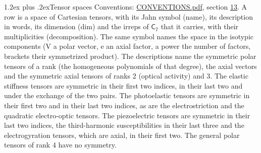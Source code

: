 \documentclass[10pt,a4paper]{article}
\makeatletter
\renewcommand\section{\@startsection{section}{1}{\z@}{-3ex plus -1ex minus -.2ex}%
  {1.2ex plus .2ex}{\normalfont\large\sffamily\bfseries\color{parttitle}}}
\numberwithin{equation}{section}
\newcommand{\grp}[1]{\mathsf{#1}}
\makeatother
\begin{document}
\section{Tensor spaces}\label{s:tensor_spaces}
Conventions: \href{../../CONVENTIONS.pdf}{CONVENTIONS.pdf}, section \href{../../CONVENTIONS.pdf\#conv.13}{13}.
\leavevmode\label{n:head.name}\label{n:head.description}\label{n:head.dim}\label{n:head.decomposition}A row is a space of Cartesian tensors, with its Jahn symbol (name), its description in words, its dimension (dim) and the irreps of $\grp{C_{7}}$ that it carries, with their multiplicities (decomposition). \label{n:label.jahn}The same symbol names the space in the isotypic components (V a polar vector, e an axial factor, a power the number of factors, brackets their symmetrized product). The descriptions name the symmetric polar tensors of a rank (the homogeneous polynomials of that degree), the axial vectors and the symmetric axial tensors of ranks 2 (optical activity) and 3. The elastic stiffness tensors are symmetric in their first two indices, in their last two and under the exchange of the two pairs. The photoelastic tensors are symmetric in their first two and in their last two indices, as are the electrostriction and the quadratic electro-optic tensors. The piezoelectric tensors are symmetric in their last two indices, the third-harmonic susceptibilities in their last three and the electrogyration tensors, which are axial, in their first two. The general polar tensors of rank 4 have no symmetry.
\end{document}
